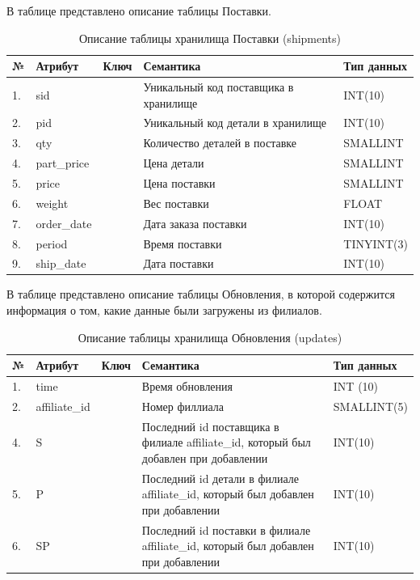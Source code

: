 В таблице  представлено описание таблицы Поставки.
\begin{table}[h]
	\caption{\space Описание таблицы хранилища Поставки (shipments)}
	\label{etl-shipments}
	\begin{tabular}{|p{0.4cm}|p{2.5cm}|p{1.5cm}|p{6.3cm}|p{3.2cm}|}
		\hline
		\textbf{№} & \textbf{Атрибут} & \textbf{Ключ} & \textbf{Семантика} & \textbf{Тип данных} \\
		\hline
		1. & sid & & Уникальный код поставщика в хранилище & INT(10) \\
		\hline
		2. & pid & & Уникальный код детали в хранилище & INT(10) \\
		\hline
		3. & qty & & Количество деталей в поставке & SMALLINT \\
		\hline
		4. & part\_price & & Цена детали & SMALLINT \\
		\hline
		5. & price & & Цена поставки & SMALLINT \\
		\hline
		6. & weight & & Вес поставки & FLOAT \\
		\hline
		7. & order\_date & & Дата заказа поставки & INT(10) \\
		\hline
		8. & period & & Время поставки & TINYINT(3) \\
		\hline
		9. & ship\_date & & Дата поставки & INT(10) \\
		\hline
	\end{tabular}
\end{table}

В таблице  представлено описание таблицы Обновления, в которой содержится информация о том, какие данные были загружены из филиалов.
\begin{table}[h]
	\caption{\space Описание таблицы хранилища Обновления (updates)}
	\label{etl-updates}
	\begin{tabular}{|p{0.4cm}|p{2.5cm}|p{1.5cm}|p{6.3cm}|p{3.2cm}|}
		\hline
		\textbf{№} & \textbf{Атрибут} & \textbf{Ключ} & \textbf{Семантика} & \textbf{Тип данных} \\
		\hline
		1. & time & & Время обновления & INT (10) \\
		\hline
		2. & affiliate\_id & & Номер филлиала & SMALLINT(5) \\
		\hline
		4. & S & & Последний id поставщика в филиале affiliate\_id, который был добавлен при добавлении & INT(10) \\
		\hline
		5. & P & & Последний id детали в филиале affiliate\_id, который был добавлен при добавлении & INT(10) \\
		\hline
		6. & SP & & Последний id поставки в филиале affiliate\_id, который был добавлен при добавлении & INT(10) \\
		\hline
	\end{tabular}
\end{table}

